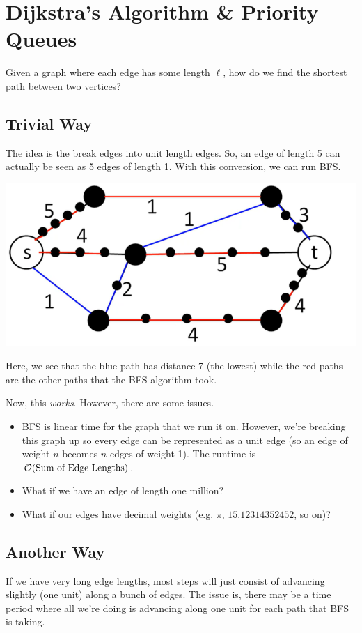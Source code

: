 \documentclass[letterpaper]{article}
\begin{document}
\section{Dijkstra's Algorithm \& Priority Queues}
Given a graph where each edge has some length $\ell$, how do we find the shortest path between two vertices? 

\subsection{Trivial Way}
The idea is the break edges into unit length edges. So, an edge of length 5 can actually be seen as 5 edges of length 1. With this conversion, we can run BFS. 
\begin{center}
    \includegraphics[scale=0.4]{../assets/bfs_unit_edges.png}
\end{center}
Here, we see that the blue path has distance 7 (the lowest) while the red paths are the other paths that the BFS algorithm took. 

\bigskip 

Now, this \emph{works}. However, there are some issues. 
\begin{itemize}
    \item BFS is linear time for the graph that we run it on. However, we're breaking this graph up so every edge can be represented as a unit edge (so an edge of weight $n$ becomes $n$ edges of weight 1). The runtime is $\mathcal{O}(\text{Sum of Edge Lengths})$.
    \item What if we have an edge of length one million? 
    \item What if our edges have decimal weights (e.g. $\pi$, $15.12314352452$, so on)?
\end{itemize}

\subsection{Another Way}
If we have very long edge lengths, most steps will just consist of advancing slightly (one unit) along a bunch of edges. The issue is, there may be a time period where all we're doing is advancing along one unit for each path that BFS is taking. 
\end{document}
